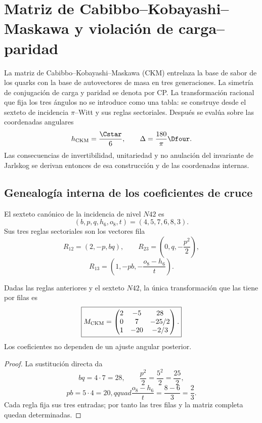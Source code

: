 \chapter{Matriz de Cabibbo--Kobayashi--Maskawa y violación de carga--paridad}
\label{chap:ckm}

La matriz de Cabibbo--Kobayashi--Maskawa (CKM) entrelaza la base de sabor de
los quarks con la base de autovectores de masa en tres generaciones. La
simetría de conjugación de carga y paridad se denota por CP\@. La
transformación racional que fija los tres ángulos no se introduce como una
tabla: se construye desde el sexteto de incidencia \(\pi\)--Witt y sus reglas
sectoriales. Después se evalúa sobre las coordenadas angulares
\[
 h_{\rm CKM}=\frac{\Cstar}{6},
 \qquad
 \Delta=\frac{180}{\pi}\Dfour.
\]
Las consecuencias de invertibilidad, unitariedad y no anulación del
invariante de Jarlskog se derivan entonces de esa construcción y de las
coordenadas internas.

\section{Genealogía interna de los coeficientes de cruce}
\label{sec:genealogia-n42-ckm-rev7}

El sexteto canónico de la incidencia de nivel \(N42\) es
\[
 (b,p,q,h_6,o_8,t)=(4,5,7,6,8,3).
\]
Sus tres reglas sectoriales son los vectores fila
\[
 R_{12}=(2,-p,bq),\qquad
 R_{23}=\left(0,q,-\frac{p^2}{2}\right),
\]
\[
 R_{13}=\left(1,-pb,-\frac{o_8-h_6}{t}\right).
\]

\begin{theorem}
\label{thm:construccion-n42-ckm-rev7}
Dadas las reglas anteriores y el sexteto \(N42\), la única transformación
que las tiene por filas es
\[
 \boxed{
 M_{\rm CKM}=
 \begin{pmatrix}
 2&-5&28\\
 0&7&-25/2\\
 1&-20&-2/3
 \end{pmatrix}.}
\]
Los coeficientes no dependen de un ajuste angular posterior.
\end{theorem}

\begin{proof}
La sustitución directa da
\[
 bq=4\cdot7=28,\qquad
 \frac{p^2}{2}=\frac{5^2}{2}=\frac{25}{2},
\]
\[
 pb=5\cdot4=20,qquad
 \frac{o_8-h_6}{t}=\frac{8-6}{3}=\frac23.
\]
Cada regla fija sus tres entradas; por tanto las tres filas y la matriz
completa quedan determinadas.
\end{proof}

